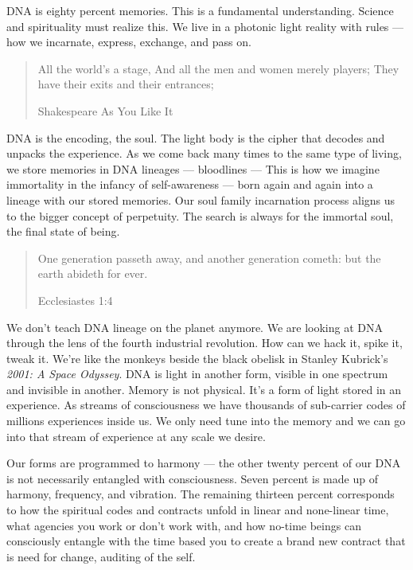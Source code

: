 \documentclass[letterpaper,9pt,twoside,titlepage,onecolumn,openany]{book}
\begin{document}
DNA is eighty percent memories. This is a fundamental understanding.
Science and spirituality must realize this. We live in a photonic light
reality with rules --- how we incarnate, express, exchange, and pass on.

\begin{quote}
All the world's a stage,
And all the men and women merely players;
They have their exits and their entrances;

Shakespeare  As You Like It
\end{quote}

DNA is the encoding, the soul. The light body is the cipher that decodes
and unpacks the experience. As we come back many times to the same type
of living, we store memories in DNA lineages --- bloodlines --- This is
how we imagine immortality in the infancy of self-awareness --- born
again and again into a lineage with our stored memories. Our soul family
incarnation process aligns us to the bigger concept of perpetuity. The
search is always for the immortal soul, the final state of being.

\begin{quote}
One generation passeth away, and another generation cometh: but the earth abideth for ever.

Ecclesiastes 1:4
\end{quote}

We don't teach DNA lineage on the planet anymore. We are looking at DNA
through the lens of the fourth industrial revolution. How can we hack
it, spike it, tweak it. We're like the monkeys beside the black obelisk
in Stanley Kubrick's \emph{2001: A Space Odyssey}. DNA is light in
another form, visible in one spectrum and invisible in another. Memory
is not physical. It's a form of light stored in an experience. ​​​​​​​As
streams of consciousness we have thousands of sub-carrier codes of
millions experiences inside us. We only need tune into the memory and we
can go into that stream of experience at any scale we desire.

Our forms are programmed to harmony --- the other twenty percent of our
DNA is not necessarily entangled with consciousness. Seven percent is
made up of harmony, frequency, and vibration. The remaining thirteen
percent corresponds to how the spiritual codes and contracts unfold in
linear and none-linear time, what agencies you work or don't work with,
and how no-time beings can consciously entangle with the time based you
to create a brand new contract that is need for change, auditing of the
self.
\end{document}
